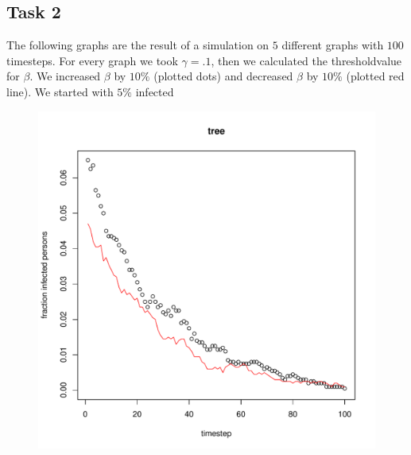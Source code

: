 \documentclass[paper=a4, fontsize=11pt]{scrartcl} %
\begin{document}
\subsection{Task 2}
The following graphs are the result of a simulation on $5$ different graphs with $100$ timesteps. For every graph we took $\gamma=.1$, then we calculated the thresholdvalue for $\beta$. We increased $\beta$ by $10\%$ (plotted dots) and decreased $\beta$ by $10\%$ (plotted red line). We started with $5\%$ infected

\begin{figure}[htbp] %
   \centering
   \includegraphics[width=\textwidth]{thresholdSimulation_tree} 
   \label{tree}
\end{figure}
\end{document}
